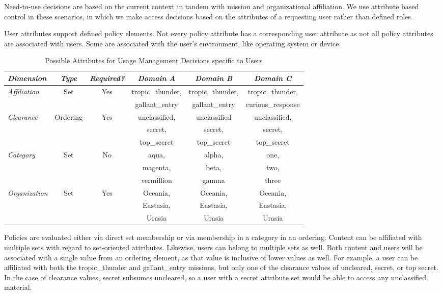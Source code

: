 Need-to-use decisions are based on the current context in tandem with mission and organizational affiliation.  We use attribute based control in these scenarios, in which we make access decisions based on the attributes of a requesting user rather than defined roles.

User attributes support defined policy elements.  Not every policy attribute has a corresponding user attribute as not all policy attributes are associated with users.  Some are associated with the user's environment, like operating system or device.

\begin{table*}[tp] %
\centering %
\begin{tabular}{lccccc}
\toprule %
\emph{Dimension}		& \emph{Type}	& \emph{Required?}	& \emph{Domain A}	& \emph{Domain B}	& \emph{Domain C} 	\\\toprule
\emph{Affiliation} 	& Set 			& Yes 				& tropic\_thunder, 	& tropic\_thunder,	& tropic\_thunder, 	\\
					&				&					& gallant\_entry		& gallant\_entry		& curious\_response	\\\midrule
\emph{Clearance} 	& Ordering 		& Yes 				& unclassified,		& unclassified		& unclassified,		\\
					&				&					& secret,			& secret,			& secret,			\\
					&				&					& top\_secret		& top\_secret		& top\_secret		\\\midrule
\emph{Category}		& Set 			& No 				& aqua,				& alpha,				& one,				\\
					&				&					& magenta,			& beta,				& two,				\\
					&				&					& vermillion			& gamma				& three				\\\midrule
\emph{Organization}	& Set 			& Yes 				& Oceania, 			& Oceania,			& Oceania,			\\
					&				&					& Eastasia,			& Eastasia,			& Eastasia,			\\
					&				&					& Urasia				& Urasia				& Urasia				\\\midrule
\end{tabular}
\caption{Possible Attributes for Usage Management Decisions specific to Users}
\label{table:model:user-attributes}
\end{table*}

Policies are evaluated either via direct set membership or via membership in a category in an ordering.  Content can be affiliated with multiple sets with regard to set-oriented attributes.  Likewise, users can belong to multiple sets as well.  Both content and users will be associated with a single value from an ordering element, as that value is inclusive of lower values as well.  For example, a user can be affiliated with both the tropic\_thunder and gallant\_entry missions, but only one of the clearance values of uncleared, secret, or top secret.  In the case of clearance values, secret subsumes uncleared, so a user with a secret attribute set would be able to access any unclassified material.

